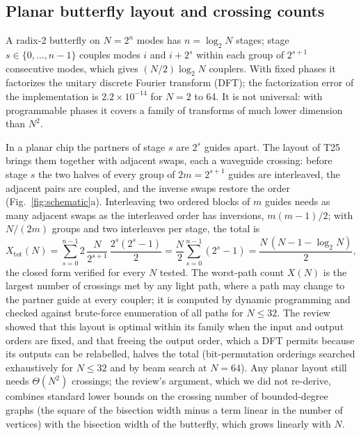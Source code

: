 \documentclass[11pt,a4paper]{article}
\begin{document}
\subsection{Planar butterfly layout and crossing counts}
\label{sec:crossmodel}

A radix-2 butterfly on $N=2^n$ modes has $n=\log_2N$ stages; stage $s\in\{0,\dots,n-1\}$ couples modes $i$ and $i+2^s$ within each group of $2^{s+1}$ consecutive modes, which gives $(N/2)\log_2N$ couplers. With fixed phases it factorizes the unitary discrete Fourier transform (DFT); the factorization error of the implementation is $2.2\times10^{-14}$ for $N=2$ to 64. It is not universal: with programmable phases it covers a family of transforms of much lower dimension than $N^2$.

In a planar chip the partners of stage $s$ are $2^s$ guides apart. The layout of T25 brings them together with adjacent swaps, each a waveguide crossing: before stage $s$ the two halves of every group of $2m=2^{s+1}$ guides are interleaved, the adjacent pairs are coupled, and the inverse swaps restore the order (Fig.~\ref{fig:schematic}a). Interleaving two ordered blocks of $m$ guides needs as many adjacent swaps as the interleaved order has inversions, $m(m-1)/2$; with $N/(2m)$ groups and two interleaves per stage, the total is
\begin{equation}
X_\mathrm{tot}(N)=\sum_{s=0}^{n-1}2\,\frac{N}{2^{s+1}}\,\frac{2^s(2^s-1)}{2}=\frac{N}{2}\sum_{s=0}^{n-1}\left(2^s-1\right)=\frac{N\,(N-1-\log_2N)}{2},
\label{eq:crossings}
\end{equation}
the closed form verified for every $N$ tested. The worst-path count $X(N)$ is the largest number of crossings met by any light path, where a path may change to the partner guide at every coupler; it is computed by dynamic programming and checked against brute-force enumeration of all paths for $N\le32$. The review showed that this layout is optimal within its family when the input and output orders are fixed, and that freeing the output order, which a DFT permits because its outputs can be relabelled, halves the total (bit-permutation orderings searched exhaustively for $N\le32$ and by beam search at $N=64$). Any planar layout still needs $\Theta(N^2)$ crossings; the review's argument, which we did not re-derive, combines standard lower bounds on the crossing number of bounded-degree graphs (the square of the bisection width minus a term linear in the number of vertices) with the bisection width of the butterfly, which grows linearly with $N$.
\end{document}

